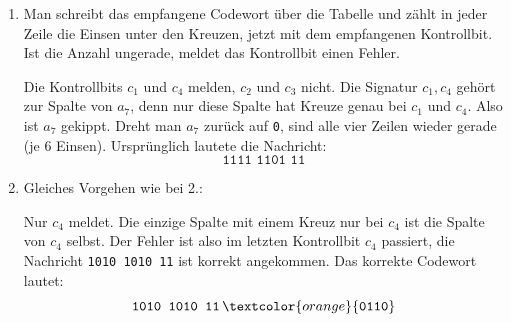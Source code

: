 \begin{myexercise}
\begin{myanswer}
\begin{enumerate}
            \item Man schreibt das empfangene Codewort über die Tabelle und
                  zählt in jeder Zeile die Einsen unter den Kreuzen, jetzt mit
                  dem empfangenen Kontrollbit. Ist die Anzahl ungerade, meldet
                  das Kontrollbit einen Fehler.
                  \begin{center}
                  \end{center}
                  Die Kontrollbits \(c_1\) und \(c_4\) melden, \(c_2\) und \(c_3\)
                  nicht. Die Signatur \(c_1,c_4\) gehört zur Spalte von \(a_7\),
                  denn nur diese Spalte hat Kreuze genau bei \(c_1\) und \(c_4\).
                  Also ist \(a_7\) gekippt. Dreht man \(a_7\) zurück auf
                  \texttt{0}, sind alle vier Zeilen wieder gerade
                  (je 6 Einsen). Ursprünglich lautete die Nachricht:
                  \[
                      \texttt{1111 1101 11}
                  \]

            \item Gleiches Vorgehen wie bei 2.:
                  \begin{center}
                  \end{center}
                  Nur \(c_4\) meldet. Die einzige Spalte mit einem Kreuz nur bei
                  \(c_4\) ist die Spalte von \(c_4\) selbst. Der Fehler ist also im
                  letzten Kontrollbit \(c_4\) passiert, die Nachricht
                  \texttt{1010 1010 11} ist korrekt angekommen.
                  Das korrekte Codewort lautet:
                  \[
                      \texttt{1010 1010 11}\,
                      \textcolor{orange}{\texttt{0110}}
                  \]
        \end{enumerate}
    \end{myanswer}

\end{myexercise}













